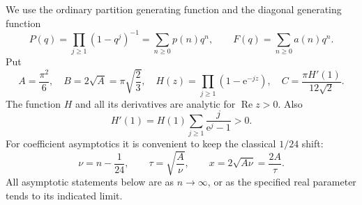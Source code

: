 \documentclass[11pt,letterpaper]{article}
\numberwithin{equation}{section}
\theoremstyle{definition}\newtheorem{definition}[theorem]{Definition}
\theoremstyle{remark}\newtheorem{remark}[theorem]{Remark}
\newcommand{\ee}{\mathrm e}
\DeclareMathOperator{\Rea}{Re}
\begin{document}
We use the ordinary partition generating function and the diagonal generating function
\begin{equation}\label{dmm:eq:PF}
P(q)=\prod_{j\ge1}(1-q^j)^{-1}=\sum_{n\ge0}p(n)q^n,
\qquad F(q)=\sum_{n\ge0}a(n)q^n.
\end{equation}
Put
\begin{equation}\label{dmm:eq:constants}
A=\frac{\pi^2}{6},\quad B=2\sqrt A=\pi\sqrt{\frac23},\quad
H(z)=\prod_{j\ge1}(1-\ee^{-jz}),\quad
C=\frac{\pi H'(1)}{12\sqrt2}.
\end{equation}
The function $H$ and all its derivatives are analytic for $\Rea z>0$. Also
\begin{equation}\label{dmm:eq:positive}
H'(1)=H(1)\sum_{j\ge1}\frac{j}{\ee^j-1}>0.
\end{equation}
For coefficient asymptotics it is convenient to keep the classical $1/24$ shift:
\begin{equation}\label{dmm:eq:saddlepar}
\nu=n-\frac1{24},\qquad \tau=\sqrt{\frac A\nu},\qquad
x=2\sqrt{A\nu}=\frac{2A}{\tau}.
\end{equation}
All asymptotic statements below are as $n\to\infty$, or as the specified real parameter tends to its indicated limit.
\end{document}
